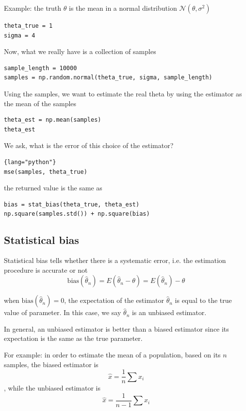 Example: the truth $\theta$ is the mean in a normal distribution $\mathcal{N}(\theta, \sigma^2)$ 
\begin{lstlisting}
theta_true = 1
sigma = 4
\end{lstlisting}
Now, what we really have is a collection of samples
\begin{lstlisting}
sample_length = 10000
samples = np.random.normal(theta_true, sigma, sample_length)
\end{lstlisting}
Using the samples, we want to estimate the real theta by using the estimator as the mean of the samples
\begin{lstlisting}
theta_est = np.mean(samples)
theta_est
\end{lstlisting}
We ask, what is the error of this choice of the estimator?
\begin{lstlisting}{lang="python"}
mse(samples, theta_true)
\end{lstlisting}
the returned value is the same as 
\begin{lstlisting}
bias = stat_bias(theta_true, theta_est)
np.square(samples.std()) + np.square(bias)
\end{lstlisting}

\subsection{Statistical bias}
\label{sec:math-statistical-bias}
Statistical bias tells whether there is a systematic error, i.e. the estimation
procedure is accurate or not
\begin{equation}
\mathrm{bias}(\hat{\theta}_n) = E(\hat{\theta}_n - \theta) = E(\hat{\theta}_n) - \theta
\end{equation}

when $\mathrm{bias}(\hat{\theta}_n) = 0$, the expectation of the estimator
$\hat{\theta}_n$ is equal to the true value of parameter.
In this case, we say $\hat{\theta}_n$ is an unbiased estimator.  

In general, an unbiased estimator is better than a biased estimator since its
expectation is the same as the true parameter.

For example: in order to estimate the mean of a population, based on its $n$ samples, the biased estimator is 
\begin{equation}
\hat{x} = \frac{1}{n} \sum x_i
\end{equation}
, while the unbiased estimator is
\begin{equation}
\hat{x} = \frac{1}{n-1} \sum x_i
\end{equation}


